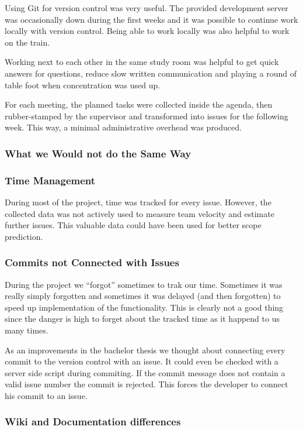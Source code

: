 Using Git\cite{GIT} for
version 
control was very useful. The provided development server was occasionally down 
during the first weeks and it was possible to continue work locally with version
control. Being able to work locally was also helpful to work on the train. 

Working next to each other in the same study room was helpful to get quick 
answers for questions, reduce slow written communication and playing a round of 
table foot when concentration was used up.

For each meeting, the planned tasks were collected inside the agenda, then 
rubber-stamped by the supervisor and transformed into issues for the following 
week. This way, a minimal administrative overhead was produced.

\subsubsection{What we Would not do the Same Way}
\label{notgood}

\subsubsection*{Time Management}

During most of the project, time was tracked for every issue. 
However, the collected data was not actively used to measure team velocity and 
estimate further issues. This valuable data could have been used for better 
scope prediction.

\subsubsection*{Commits not Connected with Issues}

During the project we ``forgot'' sometimes to trak our time. Sometimes it was
really simply forgotten and sometimes it was delayed (and then forgotten) to
speed up implementation of the functionality. This is clearly not a good thing
since the danger is high to forget about the tracked time as it happend to us
many times.

As an improvements in the bachelor thesis we thought about connecting every
commit to the version control with an issue. It could even be checked with a
server side script during commiting. If the commit message does not contain a
valid issue number the commit is rejected. This forces the developer to connect
his commit to an issue.

\subsubsection*{Wiki and Documentation differences}

